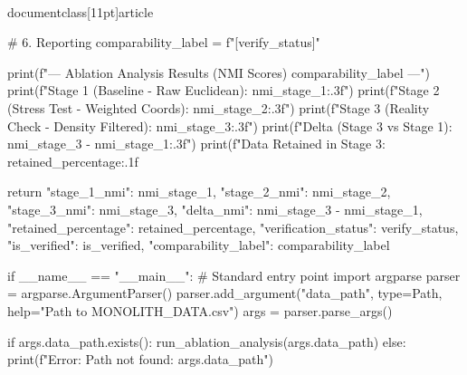 \\documentclass[11pt]{article}
\begin{document}
\begin{CodeBlock}
    # 6. Reporting
    comparability_label = f"[{verify_status}]"
    
    print(f"\n--- Ablation Analysis Results (NMI Scores) {comparability_label} ---")
    print(f"Stage 1 (Baseline - Raw Euclidean): {nmi_stage_1:.3f}")
    print(f"Stage 2 (Stress Test - Weighted Coords): {nmi_stage_2:.3f}")
    print(f"Stage 3 (Reality Check - Density Filtered): {nmi_stage_3:.3f}")
    print(f"Delta (Stage 3 vs Stage 1): {nmi_stage_3 - nmi_stage_1:.3f}")
    print(f"Data Retained in Stage 3: {retained_percentage:.1f}%

    return {
        "stage_1_nmi": nmi_stage_1,
        "stage_2_nmi": nmi_stage_2,
        "stage_3_nmi": nmi_stage_3,
        "delta_nmi": nmi_stage_3 - nmi_stage_1,
        "retained_percentage": retained_percentage,
        "verification_status": verify_status,
        "is_verified": is_verified,
        "comparability_label": comparability_label
    }

if __name__ == "__main__":
    # Standard entry point
    import argparse
    parser = argparse.ArgumentParser()
    parser.add_argument("data_path", type=Path, help="Path to MONOLITH_DATA.csv")
    args = parser.parse_args()
    
    if args.data_path.exists():
        run_ablation_analysis(args.data_path)
    else:
        print(f"Error: Path not found: {args.data_path}")

\end{CodeBlock}
\end{document}
